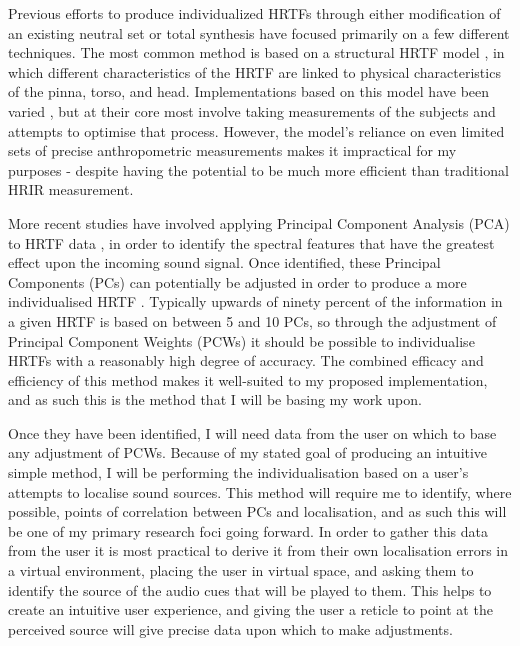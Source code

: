 \documentclass[10pt, oneside, a4paper, draft]{scrartcl}
\begin{document}
Previous efforts to produce individualized HRTFs through either modification of an existing neutral set or total synthesis have focused primarily on a few different techniques. The most common method is based on a structural HRTF model \citep{PhillipBrown1998, Raykar2003}, in which different characteristics of the HRTF are linked to physical characteristics of the pinna, torso, and head. Implementations based on this model have been varied \citep{Tashev2014, Xu2007, DmitryN.ZotkinJaneHwangRamaniDuraiswami2003}, but at their core most involve taking measurements of the subjects and attempts to optimise that process. However, the model's reliance on even limited sets of precise anthropometric measurements makes it impractical for my purposes - despite having the potential to be much more efficient than traditional HRIR measurement. 

More recent studies have involved applying Principal Component Analysis (PCA) to HRTF data \citep{Holzl2012a}, in order to identify the spectral features that have the greatest effect upon the incoming sound signal. Once identified, these Principal Components (PCs) can potentially be adjusted in order to produce a more individualised HRTF \citep{Fink2012,Holzl2014a}. Typically upwards of ninety percent of the information in a given HRTF is based on between 5 and 10 PCs, so through the adjustment of Principal Component Weights (PCWs) it should be possible to individualise HRTFs with a reasonably high degree of accuracy. The combined efficacy and efficiency of this method makes it well-suited to my proposed implementation, and as such this is the method that I will be basing my work upon. 

Once they have been identified, I will need data from the user on which to base any adjustment of PCWs. Because of my stated goal of producing an intuitive simple method, I will be performing the individualisation based on a user's attempts to localise sound sources. This method will require me to identify, where possible, points of correlation between PCs and localisation, and as such this will be one of my primary research foci going forward. In order to gather this data from the user it is most practical to derive it from their own localisation errors in a virtual environment, placing the user in virtual space, and asking them to identify the source of the audio cues that will be played to them. This helps to create an intuitive user experience, and giving the user a reticle to point at the perceived source will give precise data upon which to make adjustments. 
\end{document}
